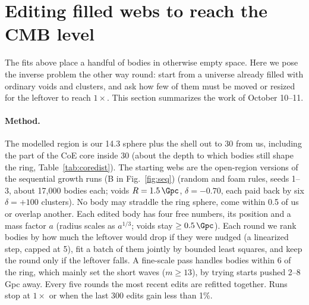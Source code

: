 \documentclass[aps,prd,twocolumn,nofootinbib,superscriptaddress,floatfix]{revtex4-2}
\renewcommand{\dblfloatpagefraction}{0.75}\renewcommand{\floatpagefraction}{0.75}
\begin{document}
\FloatBarrier
\renewcommand{\dblfloatpagefraction}{0.5}\renewcommand{\floatpagefraction}{0.5}
\section{Editing filled webs to reach the CMB level}\label{sec:minedit}
The fits above place a handful of bodies in otherwise empty space. Here we pose the inverse problem the other way round: start from a universe already filled with ordinary voids and clusters, and ask how few of them must be moved or resized for the leftover to reach $1\times$. This section summarizes the work of October 10--11.

\paragraph*{Method.} The modelled region is our \SI{14.3}{\Gpc} sphere plus the shell out to \SI{30}{\Gpc} from us, including the part of the CoE core inside \SI{30}{\Gpc} (about the depth to which bodies still shape the ring, Table~\ref{tab:coredist}). The starting webs are the open-region versions of the sequential growth runs (B in Fig.~\ref{fig:seq}) (random and foam rules, seeds 1--3, about 17,000 bodies each; voids $R=\SI{1.5}{\Gpc}$, $\delta=-0.70$, each paid back by six $\delta=+100$ clusters). No body may straddle the ring sphere, come within \SI{0.5}{\Gpc} of us or overlap another. Each edited body has four free numbers, its position and a mass factor $a$ (radius scales as $a^{1/3}$; voids stay $\geq\SI{0.5}{\Gpc}$). Each round we rank bodies by how much the leftover would drop if they were nudged (a linearized step, capped at \SI{5}{\Gpc}), fit a batch of them jointly by bounded least squares, and keep the round only if the leftover falls. A fine-scale pass handles bodies within \SI{6}{\Gpc} of the ring, which mainly set the short waves ($m\geq13$), by trying starts pushed 2--8\,Gpc away. Every five rounds the most recent edits are refitted together. Runs stop at $1\times$ or when the last 300 edits gain less than 1\%.
\end{document}
